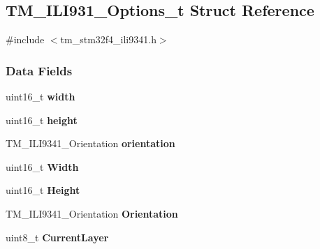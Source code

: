 \hypertarget{struct_t_m___i_l_i931___options__t}{}\subsection{T\+M\+\_\+\+I\+L\+I931\+\_\+\+Options\+\_\+t Struct Reference}
\label{struct_t_m___i_l_i931___options__t}


{\ttfamily \#include $<$tm\+\_\+stm32f4\+\_\+ili9341.\+h$>$}

\subsubsection*{Data Fields}
\begin{DoxyCompactItemize}
\item 
\hypertarget{struct_t_m___i_l_i931___options__t_ad0eab1042455a2067c812ab8071d5376}{}uint16\+\_\+t {\bfseries width}\label{struct_t_m___i_l_i931___options__t_ad0eab1042455a2067c812ab8071d5376}

\item 
\hypertarget{struct_t_m___i_l_i931___options__t_a81c9f8d0b8c3b49d770be14dbe9f0d37}{}uint16\+\_\+t {\bfseries height}\label{struct_t_m___i_l_i931___options__t_a81c9f8d0b8c3b49d770be14dbe9f0d37}

\item 
\hypertarget{struct_t_m___i_l_i931___options__t_acb90333c1789ff7d151f36ab3fe8fe4f}{}T\+M\+\_\+\+I\+L\+I9341\+\_\+\+Orientation {\bfseries orientation}\label{struct_t_m___i_l_i931___options__t_acb90333c1789ff7d151f36ab3fe8fe4f}

\item 
\hypertarget{struct_t_m___i_l_i931___options__t_a9b3fe5d83fe7eb60cd86008934f65616}{}uint16\+\_\+t {\bfseries Width}\label{struct_t_m___i_l_i931___options__t_a9b3fe5d83fe7eb60cd86008934f65616}

\item 
\hypertarget{struct_t_m___i_l_i931___options__t_a1a634e0d0d740b55406a6c2c194a7bfc}{}uint16\+\_\+t {\bfseries Height}\label{struct_t_m___i_l_i931___options__t_a1a634e0d0d740b55406a6c2c194a7bfc}

\item 
\hypertarget{struct_t_m___i_l_i931___options__t_a210a5f4e657b82d7c3471d89224f469e}{}T\+M\+\_\+\+I\+L\+I9341\+\_\+\+Orientation {\bfseries Orientation}\label{struct_t_m___i_l_i931___options__t_a210a5f4e657b82d7c3471d89224f469e}

\item 
\hypertarget{struct_t_m___i_l_i931___options__t_af7fc38010fab29b4994bd050ac418f5f}{}uint8\+\_\+t {\bfseries Current\+Layer}\label{struct_t_m___i_l_i931___options__t_af7fc38010fab29b4994bd050ac418f5f}


\end{DoxyCompactItemize}
